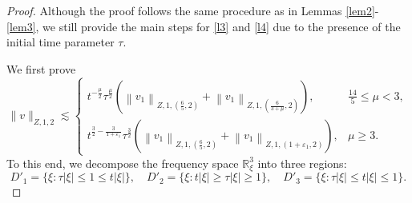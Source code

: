 \documentclass[11pt,twoside]{article}
\newcommand{\R}{\mathbb R}
\newcommand{\f}{\frac}
\theoremstyle{plain}
\theoremstyle{definition}
\theoremstyle{remark}
\numberwithin{equation}{section}
\begin{document}
\begin{proof}
Although the proof follows the same procedure as in  Lemmas \ref{lem2}-\ref{lem3},
we still provide the main steps  for \eqref{l3} and \eqref{l4} due to  the presence of the initial time parameter $\tau$.

We first prove
$$
\|v\|_{Z, 1, 2} \lesssim \begin{cases}
t^{-\f{\mu}{2}}\tau^{\f{\mu}{2}}(\left\|v_1\right\|_{Z, 1,(\f65, 2)}+\left\|v_1\right\|_{Z, 1,(\f{6}{3+\mu}, 2)}),& \f{14}{5}\leq\mu<3,\\
t^{\f{3}{2}-\f{3}{1+\varepsilon_1}}\tau^\f32(\left\|v_1\right\|_{Z, 1,(\f65, 2)}+\left\|v_1\right\|_{Z, 1,(1+\varepsilon_1, 2)}),& \mu\geq3.
\end{cases}
$$
To this end,  we decompose the frequency space $\R^3_{\xi}$ into three regions:
\begin{equation}\label{l5}
D'_1=\{\xi: \tau|\xi| \leq 1 \leq t|\xi|\}, \quad D'_2=\{\xi: t|\xi|\geq\tau|\xi|\ge 1\}, \quad D'_3=\{\xi: \tau|\xi|\leq t|\xi| \leq 1\}.
\end{equation}




\end{proof}
\end{document}
